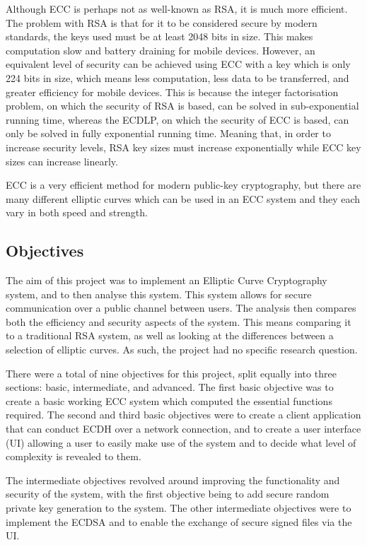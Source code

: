 \documentclass[12pt,a4paper]{article}
\begin{document}
Although ECC is perhaps not as well-known as RSA, it is much more efficient. 
The problem with RSA is that for it to be considered secure by modern standards, the keys used must be at least 2048 bits in size. 
This makes computation slow and battery draining for mobile devices. 
However, an equivalent level of security can be achieved using ECC with a key which is only 224 bits in size, 
which means less computation, less data to be transferred, and greater efficiency for mobile devices. 
This is because the integer factorisation problem, on which the security of RSA is based, can be solved in sub-exponential running time, 
whereas the ECDLP, on which the security of ECC is based, can only be solved in fully exponential running time. 
Meaning that, in order to increase security levels, RSA key sizes must increase exponentially while ECC key sizes can increase linearly. 

ECC is a very efficient method for modern public-key cryptography, 
but there are many different elliptic curves which can be used in an ECC system and they each vary in both speed and strength. 


\subsection{Objectives} \noindent \label{Objectives}
The aim of this project was to implement an Elliptic Curve Cryptography system, 
and to then analyse this system. 
This system allows for secure communication over a public channel between users. 
The analysis then compares both the efficiency and security aspects of the system. 
This means comparing it to a traditional RSA system, 
as well as looking at the differences between a selection of elliptic curves. 
As such, the project had no specific research question. 

There were a total of nine objectives for this project, split equally into three sections: basic, intermediate, and advanced. 
The first basic objective was to create a basic working ECC system which computed the essential functions required. 
The second and third basic objectives were to create a client application that can conduct ECDH over a network connection, 
and to create a user interface (UI) allowing a user to easily make use of the system and to decide what level of complexity is revealed to them. 

The intermediate objectives revolved around improving the functionality and security of the system, 
with the first objective being to add secure random private key generation to the system. 
The other intermediate objectives were to implement the ECDSA and to enable the exchange of secure signed files via the UI. 
\end{document}
